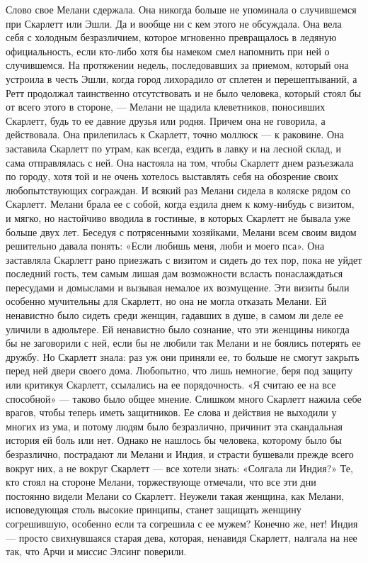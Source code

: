 Слово свое Мелани сдержала. Она никогда больше не упоминала о случившемся при Скарлетт или Эшли. Да и вообще ни с кем этого не обсуждала. Она вела себя с холодным безразличием, которое мгновенно превращалось в ледяную официальность, если кто-либо хотя бы намеком смел напомнить при ней о случившемся. На протяжении недель, последовавших за приемом, который она устроила в честь Эшли, когда город лихорадило от сплетен и перешептываний, а Ретт продолжал таинственно отсутствовать и не было человека, который стоял бы от всего этого в стороне, — Мелани не щадила клеветников, поносивших Скарлетт, будь то ее давние друзья или родня. Причем она не говорила, а действовала.
Она прилепилась к Скарлетт, точно моллюск — к раковине. Она заставила Скарлетт по утрам, как всегда, ездить в лавку и на лесной склад, и сама отправлялась с ней. Она настояла на том, чтобы Скарлетт днем разъезжала по городу, хотя той и не очень хотелось выставлять себя на обозрение своих любопытствующих сограждан. И всякий раз Мелани сидела в коляске рядом со Скарлетт. Мелани брала ее с собой, когда ездила днем к кому-нибудь с визитом, и мягко, но настойчиво вводила в гостиные, в которых Скарлетт не бывала уже больше двух лет. Беседуя с потрясенными хозяйками, Мелани всем своим видом решительно давала понять: «Если любишь меня, люби и моего пса».
Она заставляла Скарлетт рано приезжать с визитом и сидеть до тех пор, пока не уйдет последний гость, тем самым лишая дам возможности всласть понаслаждаться пересудами и домыслами и вызывая немалое их возмущение. Эти визиты были особенно мучительны для Скарлетт, но она не могла отказать Мелани. Ей ненавистно было сидеть среди женщин, гадавших в душе, в самом ли деле ее уличили в адюльтере. Ей ненавистно было сознание, что эти женщины никогда бы не заговорили с ней, если бы не любили так Мелани и не боялись потерять ее дружбу. Но Скарлетт знала: раз уж они приняли ее, то больше не смогут закрыть перед ней двери своего дома.
Любопытно, что лишь немногие, беря под защиту или критикуя Скарлетт, ссылались на ее порядочность. «Я считаю ее на все способной» — таково было общее мнение. Слишком много Скарлетт нажила себе врагов, чтобы теперь иметь защитников. Ее слова и действия не выходили у многих из ума, и потому людям было безразлично, причинит эта скандальная история ей боль или нет. Однако не нашлось бы человека, которому было бы безразлично, пострадают ли Мелани и Индия, и страсти бушевали прежде всего вокруг них, а не вокруг Скарлетт — все хотели знать:
«Солгала ли Индия?» Те, кто стоял на стороне Мелани, торжествующе отмечали, что все эти дни постоянно видели Мелани со Скарлетт. Неужели такая женщина, как Мелани, исповедующая столь высокие принципы, станет защищать женщину согрешившую, особенно если та согрешила с ее мужем? Конечно же, нет! Индия — просто свихнувшаяся старая дева, которая, ненавидя Скарлетт, налгала на нее так, что Арчи и миссис Элсинг поверили.

